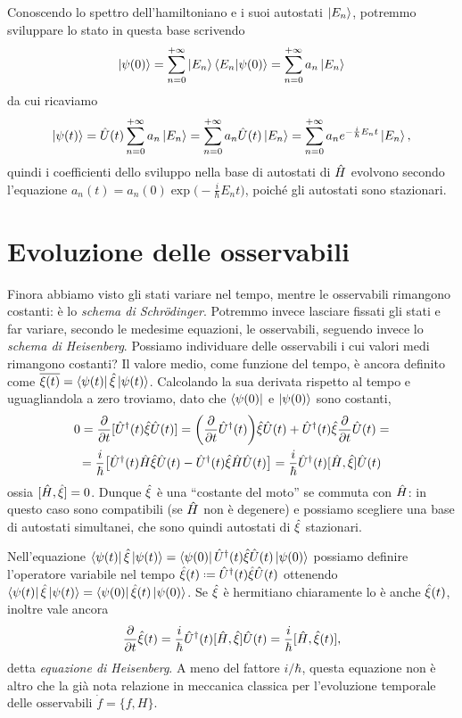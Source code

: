 Conoscendo lo spettro dell'hamiltoniano e i suoi autostati $\left|{E_n}\right\rangle$, potremmo sviluppare lo stato in questa base scrivendo
\begin{equation}
	\left|{\psi(0)}\right\rangle=\sum_{n=0}^{+\infty}\left|{E_n}\right\rangle\left\langle{E_n}\middle|{\psi(0)}\right\rangle=\sum_{n=0}^{+\infty}a_n\left|{E_n}\right\rangle
\end{equation}
da cui ricaviamo
\begin{equation}
	\left|{\psi(t)}\right\rangle=\hat{U}(t)\sum_{n=0}^{+\infty}a_n\left|{E_n}\right\rangle=\sum_{n=0}^{+\infty}a_n\hat{U}(t)\left|{E_n}\right\rangle=\sum_{n=0}^{+\infty}a_ne^{-\frac{i}{\hbar}E_nt}\left|{E_n}\right\rangle,
\end{equation}
quindi i coefficienti dello sviluppo nella base di autostati di $\hat{H}$ evolvono secondo l'equazione $a_n(t)=a_n(0)\exp\big(-\frac{i}{\hbar}E_nt\big)$, poich\'e gli autostati sono stazionari.

\section{Evoluzione delle osservabili}
Finora abbiamo visto gli stati variare nel tempo, mentre le osservabili rimangono costanti: è lo \emph{schema di Schr\"odinger}.
Potremmo invece lasciare fissati gli stati e far variare, secondo le medesime equazioni, le osservabili, seguendo invece lo \emph{schema di Heisenberg}.
Possiamo individuare delle osservabili i cui valori medi rimangono costanti?
Il valore medio, come funzione del tempo, è ancora definito come $\overline{\xi(t)}=\left\langle{\psi(t)}\right|\hat{\xi}\left|{\psi(t)}\right\rangle$.
Calcolando la sua derivata rispetto al tempo e uguagliandola a zero troviamo, dato che $\left\langle{\psi(0)}\right|$ e $\left|{\psi(0)}\right\rangle$ sono costanti,
\begin{multline}
	0=\frac{\partial {}}{\partial {t}}[{\hat{U}}^\dagger(t)\hat{\xi}\hat{U}(t)]=\bigg(\frac{\partial {}}{\partial {t}}{\hat{U}}^\dagger(t)\bigg)\hat{\xi}\hat{U}(t)+{\hat{U}}^\dagger(t)\hat{\xi}\frac{\partial {}}{\partial {t}}\hat{U}(t)=\\
	=\frac{i}{\hbar}\big[{\hat{U}}^\dagger(t)\hat{H}\hat{\xi}\hat{U}(t)-{\hat{U}}^\dagger(t)\hat{\xi}\hat{H}\hat{U}(t)\big]=\frac{i}{\hbar}{\hat{U}}^\dagger(t)[\hat{H},\hat{\xi}]\hat{U}(t)
\end{multline}
ossia $[\hat{H},\hat{\xi}]=0$.
Dunque $\hat{\xi}$ è una ``costante del moto'' se commuta con $\hat{H}$: in questo caso sono compatibili (se $\hat{H}$ non è degenere) e possiamo scegliere una base di autostati simultanei, che sono quindi autostati di $\hat{\xi}$ stazionari.

Nell'equazione $\left\langle{\psi(t)}\right|\hat{\xi}\left|{\psi(t)}\right\rangle=\left\langle{\psi(0)}\right|{\hat{U}}^\dagger(t)\hat{\xi}\hat{U}(t)\left|{\psi(0)}\right\rangle$ possiamo definire l'operatore variabile nel tempo $\op\xi(t)\defeq\adj{\op U}(t)\op\xi\op U(t)$ ottenendo $\left\langle{\psi(t)}\right|\hat{\xi}\left|{\psi(t)}\right\rangle=\left\langle{\psi(0)}\right|\hat{\xi}(t)\left|{\psi(0)}\right\rangle$.
Se $\hat{\xi}$ è hermitiano chiaramente lo è anche $\hat{\xi}(t)$, inoltre vale ancora
\begin{equation}
	\frac{\partial {}}{\partial {t}}\hat{\xi}(t)=\frac{i}{\hbar}{\hat{U}}^\dagger(t)[\hat{H},\hat{\xi}]\hat{U}(t)=\frac{i}{\hbar}[\hat{H},\hat{\xi}(t)],
	\label{eq:evoluzione-osservabili-heisenberg}
\end{equation}
detta \emph{equazione di Heisenberg}.
A meno del fattore $i/\hbar$, questa equazione non è altro che la già nota relazione in meccanica classica per l'evoluzione temporale delle osservabili $\dot{f}=\{f,H\}$.

